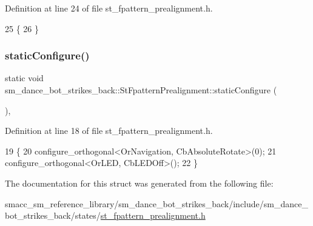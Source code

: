 Definition at line 24 of file st\+\_\+fpattern\+\_\+prealignment.\+h.


\begin{DoxyCode}
25   \{ 
26   \}
\end{DoxyCode}
\mbox{\label{structsm__dance__bot__strikes__back_1_1StFpatternPrealignment_a174f61be56796e4124aad1f97a49cb26}} 
\subsubsection{\texorpdfstring{static\+Configure()}{staticConfigure()}}
{\footnotesize\ttfamily static void sm\+\_\+dance\+\_\+bot\+\_\+strikes\+\_\+back\+::\+St\+Fpattern\+Prealignment\+::static\+Configure (\begin{DoxyParamCaption}{ }\end{DoxyParamCaption})\hspace{0.3cm}{\ttfamily [inline]}, {\ttfamily [static]}}



Definition at line 18 of file st\+\_\+fpattern\+\_\+prealignment.\+h.


\begin{DoxyCode}
19   \{
20     configure\_orthogonal<OrNavigation, CbAbsoluteRotate>(0);
21     configure\_orthogonal<OrLED, CbLEDOff>();
22   \}
\end{DoxyCode}


The documentation for this struct was generated from the following file\+:\begin{DoxyCompactItemize}
\item 
smacc\+\_\+sm\+\_\+reference\+\_\+library/sm\+\_\+dance\+\_\+bot\+\_\+strikes\+\_\+back/include/sm\+\_\+dance\+\_\+bot\+\_\+strikes\+\_\+back/states/\hyperlink{sm__dance__bot__strikes__back_2include_2sm__dance__bot__strikes__back_2states_2st__fpattern__prealignment_8h}{st\+\_\+fpattern\+\_\+prealignment.\+h}\end{DoxyCompactItemize}
